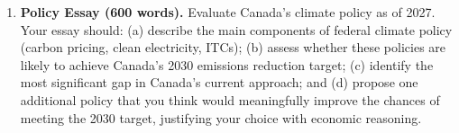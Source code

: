 \begin{enumerate}
\item \textbf{Policy Essay (600 words).} Evaluate Canada's climate policy as of 2027. Your essay should: (a) describe the main components of federal climate policy (carbon pricing, clean electricity, ITCs); (b) assess whether these policies are likely to achieve Canada's 2030 emissions reduction target; (c) identify the most significant gap in Canada's current approach; and (d) propose one additional policy that you think would meaningfully improve the chances of meeting the 2030 target, justifying your choice with economic reasoning.

\end{enumerate}
